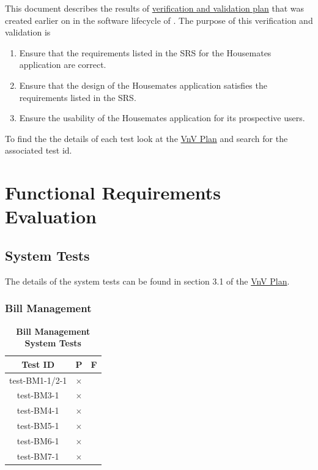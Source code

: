 \documentclass[12pt, titlepage]{article}
\begin{document}
This document describes the results of \href{https://github.com/DangJustin/CapstoneProject/blob/main/docs/VnVPlan/VnVPlan.pdf}{verification and validation plan} that was created earlier on in the software lifecycle of \progname{}. The purpose of this verification and validation  is \begin{enumerate}
    \item Ensure that the requirements listed in the SRS for the Housemates application are correct.
    \item Ensure that the design of the Housemates application satisfies the requirements listed in the SRS.
    \item Ensure the usability of the Housemates application for its prospective users.
\end{enumerate}

To find the the details of each test look at the \href{https://github.com/DangJustin/CapstoneProject/blob/main/docs/VnVPlan/VnVPlan.pdf}{VnV Plan} and search for the associated test id.

\section{Functional Requirements Evaluation}

\subsection{System Tests}

The details of the system tests can be found in section 3.1 of the \href{https://github.com/DangJustin/CapstoneProject/blob/main/docs/VnVPlan/VnVPlan.pdf}{VnV Plan}.

\subsubsection{Bill Management}

\begin{table}[H]
\centering
\begin{tabular}{|c|c|c|}
\hline
Test ID & P & F\\
\hline 
test-BM1-1/2-1 & $\times$ & \\
test-BM3-1 & $\times$ & \\
test-BM4-1 & $\times$ & \\
test-BM5-1 & $\times$ & \\
test-BM6-1 & $\times$ & \\
test-BM7-1 & $\times$ & \\
\hline
\end{tabular}
\caption{\bf Bill Management System Tests}
\end{table}
\end{document}
